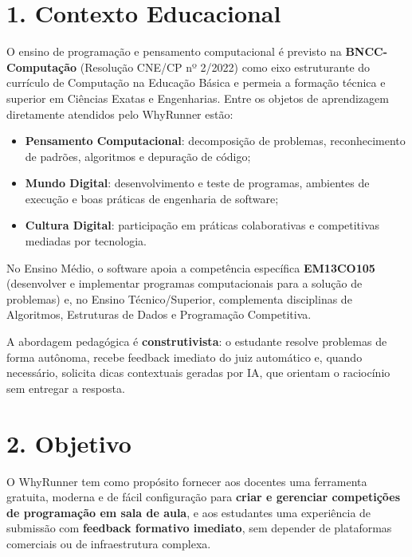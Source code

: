 \documentclass[12pt]{article}
\begin{document}


\section*{1. Contexto Educacional}

O ensino de programação e pensamento computacional é previsto na
\textbf{BNCC-Computação} (Resolução CNE/CP nº 2/2022) como eixo estruturante do
currículo de Computação na Educação Básica e permeia a formação técnica e
superior em Ciências Exatas e Engenharias. Entre os objetos de aprendizagem
diretamente atendidos pelo WhyRunner estão:

\begin{itemize}[nosep]
  \item \textbf{Pensamento Computacional}: decomposição de problemas,
        reconhecimento de padrões, algoritmos e depuração de código;
  \item \textbf{Mundo Digital}: desenvolvimento e teste de programas,
        ambientes de execução e boas práticas de engenharia de software;
  \item \textbf{Cultura Digital}: participação em práticas colaborativas e
        competitivas mediadas por tecnologia.
\end{itemize}

No Ensino Médio, o software apoia a competência específica
\textbf{EM13CO105} (desenvolver e implementar programas computacionais para a
solução de problemas) e, no Ensino Técnico/Superior, complementa disciplinas de
Algoritmos, Estruturas de Dados e Programação Competitiva.

A abordagem pedagógica é \textbf{construtivista}: o estudante resolve
problemas de forma autônoma, recebe feedback imediato do juiz automático e,
quando necessário, solicita dicas contextuais geradas por IA, que orientam o
raciocínio sem entregar a resposta.

\section*{2. Objetivo}

O WhyRunner tem como propósito fornecer aos docentes uma ferramenta gratuita,
moderna e de fácil configuração para \textbf{criar e gerenciar competições de
programação em sala de aula}, e aos estudantes uma experiência de submissão com
\textbf{feedback formativo imediato}, sem depender de plataformas comerciais
ou de infraestrutura complexa.
\end{document}
